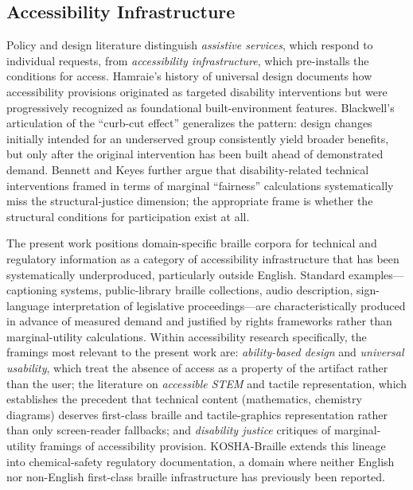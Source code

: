 \documentclass[smallextended]{svjour3}
\begin{document}
\subsection{Accessibility Infrastructure}

Policy and design literature distinguish \emph{assistive services}, which respond to individual requests, from \emph{accessibility infrastructure}, which pre-installs the conditions for access. Hamraie's history of universal design \cite{hamraie} documents how accessibility provisions originated as targeted disability interventions but were progressively recognized as foundational built-environment features. Blackwell's articulation of the ``curb-cut effect'' \cite{curb_cut} generalizes the pattern: design changes initially intended for an underserved group consistently yield broader benefits, but only after the original intervention has been built ahead of demonstrated demand. Bennett and Keyes \cite{bennett_keyes} further argue that disability-related technical interventions framed in terms of marginal ``fairness'' calculations systematically miss the structural-justice dimension; the appropriate frame is whether the structural conditions for participation exist at all.

The present work positions domain-specific braille corpora for technical and regulatory information as a category of accessibility infrastructure that has been systematically underproduced, particularly outside English. Standard examples---captioning systems, public-library braille collections, audio description, sign-language interpretation of legislative proceedings---are characteristically produced in advance of measured demand and justified by rights frameworks rather than marginal-utility calculations. Within accessibility research specifically, the framings most relevant to the present work are: \emph{ability-based design} and \emph{universal usability}, which treat the absence of access as a property of the artifact rather than the user; the literature on \emph{accessible STEM} and tactile representation, which establishes the precedent that technical content (mathematics, chemistry diagrams) deserves first-class braille and tactile-graphics representation rather than only screen-reader fallbacks; and \emph{disability justice} critiques of marginal-utility framings of accessibility provision. KOSHA-Braille extends this lineage into chemical-safety regulatory documentation, a domain where neither English nor non-English first-class braille infrastructure has previously been reported.
\end{document}
